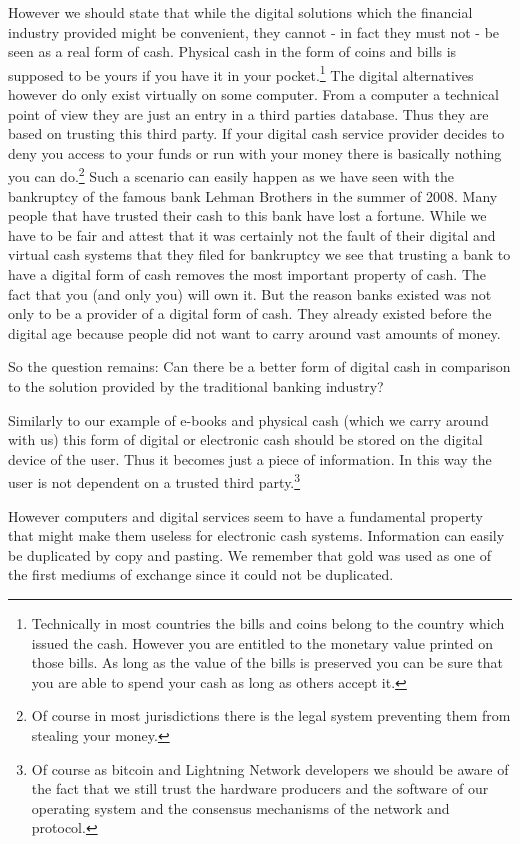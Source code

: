 \documentclass[ebook,12pt,oneside,openany]{memoir}
\begin{document}
However we should state that while the digital solutions which the financial industry provided might be convenient, they cannot - in fact they must not - be seen as a real form of cash.
Physical cash in the form of coins and bills is supposed to be yours if you have it in your pocket.\footnote{Technically in most countries the bills and coins belong to the country which issued the cash. However you are entitled to the monetary value printed on those bills. As long as the value of the bills is preserved you can be sure that you are able to spend your cash as long as others accept it.}
The digital alternatives however do only exist virtually on some computer.
From a computer a technical point of view they are just an entry in a third parties database.
Thus they are based on trusting this third party.
If your digital cash service provider decides to deny you access to your funds or run with your money there is basically nothing you can do.\footnote{Of course in most jurisdictions there is the legal system preventing them from stealing your money.}
Such a scenario can easily happen as we have seen with the bankruptcy of the famous bank Lehman Brothers in the summer of 2008. Many people that have trusted their cash to this bank have lost a fortune.
While we have to be fair and attest that it was certainly not the fault of their digital and virtual cash systems that they filed for bankruptcy we see that trusting a bank to have a digital form of cash removes the most important property of cash.
The fact that you (and only you) will own it.
But the reason banks existed was not only to be a provider of a digital form of cash.
They already existed before the digital age because people did not want to carry around vast amounts of money.

So the question remains: Can there be a better form of digital cash in comparison to the solution provided by the traditional banking industry? 

Similarly to our example of e-books and physical cash (which we carry around with us) this form of digital or electronic cash should be stored on the digital device of the user.
Thus it becomes just a piece of information.
In this way the user is not dependent on a trusted third party.\footnote{Of course as bitcoin and Lightning Network developers we should be aware of the fact that we still trust the hardware producers and the software of our operating system and the consensus mechanisms of the network and protocol.}

However computers and digital services seem to have a fundamental property that might make them useless for electronic cash systems.
Information can easily be duplicated by copy and pasting.
We remember that gold was used as one of the first mediums of exchange since it could not be duplicated.
\end{document}
